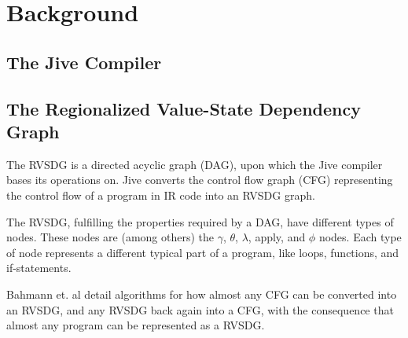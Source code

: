
\section{Background}

\subsection{The Jive Compiler}
\label{background:jive}


\subsection{The Regionalized Value-State Dependency Graph}
\label{background:RVSDG}

The RVSDG is a directed acyclic graph (DAG), upon which the Jive compiler bases
its operations on. Jive converts the control flow graph (CFG) representing the
control flow of a program in IR code into an RVSDG graph.

The RVSDG, fulfilling the properties required by a DAG, have different types of
nodes. These nodes are (among others) the $\gamma$, $\theta$, $\lambda$, apply,
and $\phi$ nodes. Each type of node represents a different typical part of a
program, like loops, functions, and if-statements.

Bahmann et. al detail algorithms for how almost any CFG
can be converted into an RVSDG, and any RVSDG back again into a CFG, with the
consequence that almost any program can
be represented as a RVSDG.

